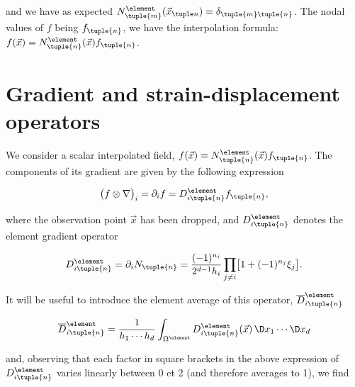 \documentclass[oneside]{memoir}
\begin{document}
and we have as expected \(N^\element_{\tuple{m}}(\vec x_{\tuple n}) = \delta_{\tuple{m}\tuple{n}}\). The nodal values of \(f\) being \(f_\tuple{n}\), we have the interpolation formula: \(f(\vec x)=N^\element_\tuple{n}(\vec x)f_\tuple{n}\).



\hypertarget{2492262002713312068}{}


\section{Gradient and strain-displacement operators}



We consider a scalar interpolated field, \(f(\vec x)=N^\element_\tuple{n}(\vec x)f_\tuple{n}\). The components of its gradient are given by the following expression



\begin{equation*}
\begin{split}\bigl(f\otimes\nabla\bigr)_i=\partial_i f=D_{i\tuple{n}}^\element f_\tuple{n},\end{split}\end{equation*}


where the observation point \(\vec x\) has been dropped, and \(D_{i\tuple{n}}^\element\) denotes the element gradient operator



\begin{equation*}
\begin{split}D_{i\tuple{n}}^\element=\partial_iN_\tuple{n}
=\frac{(-1)^{n_i}}{2^{d-1}h_i}
\prod_{j\neq i}\bigl[1+(-1)^{n_j}\xi_j\bigr].\end{split}\end{equation*}


It will be useful to introduce the element average of this operator, \(\overline{D}_{i\tuple{n}}^\element\)



\begin{equation*}
\begin{split}\overline{D}_{i\tuple{n}}^\element=\frac 1{h_1\cdots h_d}
\int_{\Omega^\element}D^\element_{i\tuple{n}}(\vec x)\,\D x_1\cdots\D x_d\end{split}\end{equation*}


and, observing that each factor in square brackets in the above expression of \(D^\element_{i\tuple{n}}\) varies linearly between 0 et 2 (and therefore averages to 1), we find
\end{document}

